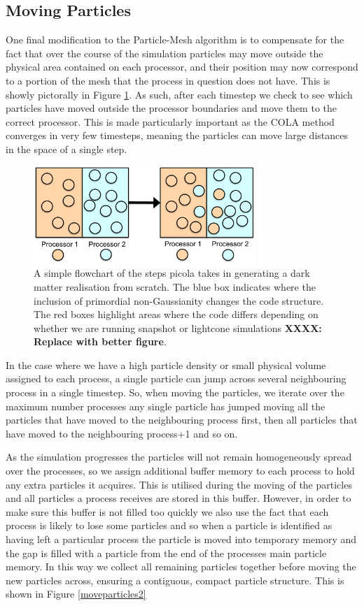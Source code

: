 \documentclass[5p,authoryear]{elsarticle}
\begin{document}
\subsection{Moving Particles}

One final modification to the Particle-Mesh algorithm is to compensate for the fact that over the course of the simulation particles may move outside the physical area contained on each processor, and their position may now correspond to a portion of the mesh that the process in question does not have. This is showly pictorally in Figure \ref{moveparticles}. As such, after each timestep we check to see which particles have moved outside the processor boundaries and move them to the correct processor. This is made particularly important as the COLA method converges in very few timesteps, meaning the particles can move large distances in the space of a single step. 

\begin{figure}
\centering
\includegraphics[width=84mm]{moveparticles.pdf}
  \caption{A simple flowchart of the steps {\sc picola} takes in generating a dark matter realisation from scratch. The blue box indicates where the inclusion of primordial non-Gaussianity changes the code structure. The red boxes highlight areas where the code differs depending on whether we are running snapshot or lightcone simulations \textbf{XXXX: Replace with better figure}.}
  \label{moveparticles}
\end{figure}

In the case where we have a high particle density or small physical volume assigned to each process, a single particle can jump across several neighbouring process in a single timestep. So, when moving the particles, we iterate over the maximum number processes any single particle has jumped moving all the particles that have moved to the neighbouring process first, then all particles that have moved to the neighbouring process+1 and so on.

As the simulation progresses the particles will not remain homogeneously spread over the processes, so we assign additional buffer memory to each process to hold any extra particles it acquires. This is utilised during the moving of the particles and all particles a process receives are stored in this buffer. However, in order to make sure this buffer is not filled too quickly we also use the fact that each process is likely to lose some particles and so when a particle is identified as having left a particular process the particle is moved into temporary memory and the gap is filled with a particle from the end of the processes main particle memory. In this way we collect all remaining particles together before moving the new particles across, ensuring a contiguous, compact particle structure. This is shown in Figure \ref{moveparticles2}
\end{document}
